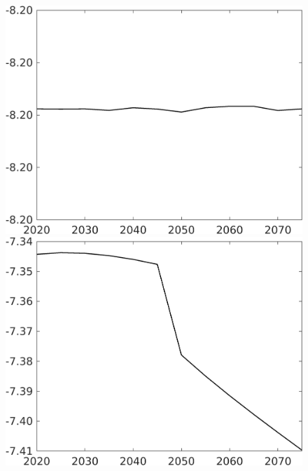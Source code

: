 \documentclass[12pt]{article}
\begin{document}
\begin{figure}[h!!]
\begin{minipage}[]{0.32\textwidth}
	\end{minipage}	
	\begin{minipage}[]{0.32\textwidth}
		\includegraphics[width=1\textwidth]{../../codding_model/own_basedOnFried/optimalPol_010922_revision/figures/all_13Sept22/CompTaufPER_bytaul_Reg0_hl_spillover0_nsk1_xgr0_knspil0_sep0_LFlimit1_emsbase0_countec0_GovRev0_etaa0.79_lgd0.png}
	\end{minipage}	
	\begin{minipage}[]{0.32\textwidth}
		\includegraphics[width=1\textwidth]{../../codding_model/own_basedOnFried/optimalPol_010922_revision/figures/all_13Sept22/CompTaufPER_bytaul_Reg0_C_spillover0_nsk1_xgr0_knspil0_sep0_LFlimit1_emsbase0_countec0_GovRev0_etaa0.79_lgd0.png}

\end{minipage}
\end{figure}
\end{document}
